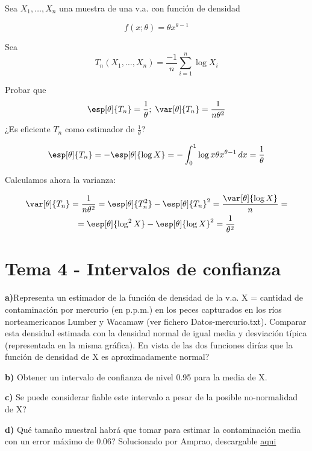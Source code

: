 \begin{problem}[9] Sea $X_1,\dotsc,X_n$ una muestra de una v.a. con función de densidad 

\[ f(x;\theta) = \theta x^{\theta - 1} \]

Sea  \[ T_n(X_1,\dotsc,X_n) = \frac{-1}{n}\sum_{i=1}^n\log X_i \]

\ppart Probar que \[\esp[\theta]{T_n} = \frac{1}{\theta};\; \var[\theta]{T_n} = \frac{1}{n\theta^2} \]
\ppart ¿Es eficiente $T_n$ como estimador de $\frac{1}{\theta}$?

\solution

\spart

\[ \esp[\theta]{T_n} = -\esp[\theta]{\log X} = - \int_0^1 \log x \theta x ^{\theta-1}\,dx = \frac{1}{\theta} \]

Calculamos ahora la varianza:

\begin{gather*}
\var[\theta]{T_n} = \frac{1}{n\theta^2} = \esp[\theta]{T_n^2} - \esp[\theta]{T_n}^2 = \frac{\var[\theta]{\log X}}{n} = \\
= \esp[\theta]{\log^2 X} - \esp[\theta]{\log X}^2 = \frac{1}{\theta^2}
\end{gather*}

\end{problem}

\section{Tema 4 - Intervalos de confianza}

\begin{problem}[1 y 2]
\textbf{a)}Representa un estimador de la función de densidad de la v.a. X = cantidad de contaminación por mercurio (en p.p.m.) en los peces capturados en los ríos norteamericanos Lumber y Wacamaw (ver fichero Datos-mercurio.txt). Comparar esta densidad estimada con la densidad normal de igual media y desviación típica (representada en la misma gráfica). En vista de las dos funciones dirías que la función de densidad de X es aproximadamente normal?

\textbf{b)} Obtener un intervalo de confianza de nivel 0.95 para la media de X.

\textbf{c)} Se puede considerar fiable este intervalo a pesar de la posible no-normalidad de X?

\textbf{d)} Qué tamaño muestral habrá que tomar para estimar la contaminación media con un error máximo de 0.06?
\solution
Solucionado por Amprao, descargable 
\href{http://www.uam.es/personal_pdi/ciencias/abaillo/MatEstI/T4DatosMercurio.pdf}{aqui}

\end{problem}

